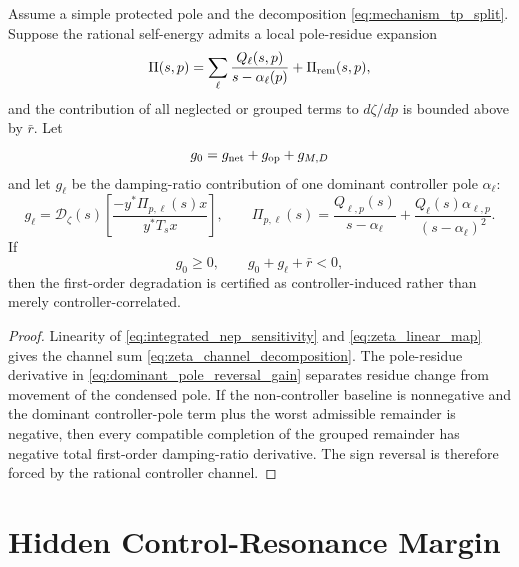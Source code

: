 \begin{proposition}
Assume a simple protected pole and the decomposition
\eqref{eq:mechanism_tp_split}. Suppose the rational self-energy admits a local
pole-residue expansion
\begin{equation}
  \Pi(s,p)
  =
  \sum_\ell \frac{Q_\ell(s,p)}{s-\alpha_\ell(p)}
  +\Pi_{\rm rem}(s,p),
  \label{eq:pi_pole_residue_expansion}
\end{equation}
and the contribution of all neglected or grouped terms to \(d\zeta/dp\) is
bounded above by \(\bar r\). Let
\begin{equation}
  g_0=g_{\rm net}+g_{\rm op}+g_{M,D}
  \label{eq:base_static_gain}
\end{equation}
and let \(g_\ell\) be the damping-ratio contribution of one dominant
controller pole \(\alpha_\ell\):
\begin{equation}
  g_\ell
  =
  \mathcal D_\zeta(s)
  \left[
  \frac{-y^*\Pi_{p,\ell}(s)x}{y^*T_sx}
  \right],
  \qquad
  \Pi_{p,\ell}(s)
  =
  \frac{Q_{\ell,p}(s)}{s-\alpha_\ell}
  +
  \frac{Q_\ell(s)\alpha_{\ell,p}}{(s-\alpha_\ell)^2}.
  \label{eq:dominant_pole_reversal_gain}
\end{equation}
If
\begin{equation}
  g_0\ge0,
  \qquad
  g_0+g_\ell+\bar r<0,
  \label{eq:controller_induced_reversal_certificate}
\end{equation}
then the first-order degradation is certified as controller-induced rather
than merely controller-correlated.
\end{proposition}

\begin{proof}
Linearity of \eqref{eq:integrated_nep_sensitivity} and
\eqref{eq:zeta_linear_map} gives the channel sum
\eqref{eq:zeta_channel_decomposition}. The pole-residue derivative in
\eqref{eq:dominant_pole_reversal_gain} separates residue change from movement
of the condensed pole. If the non-controller baseline is nonnegative and the
dominant controller-pole term plus the worst admissible remainder is negative,
then every compatible completion of the grouped remainder has negative total
first-order damping-ratio derivative. The sign reversal is therefore forced by
the rational controller channel.
\end{proof}

\section{Hidden Control-Resonance Margin}

